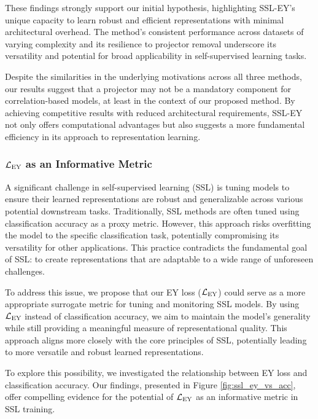 These findings strongly support our initial hypothesis, highlighting SSL-EY's unique capacity to learn robust and efficient representations with minimal architectural overhead. The method's consistent performance across datasets of varying complexity and its resilience to projector removal underscore its versatility and potential for broad applicability in self-supervised learning tasks.

Despite the similarities in the underlying motivations across all three methods, our results suggest that a projector may not be a mandatory component for correlation-based models, at least in the context of our proposed method. By achieving competitive results with reduced architectural requirements, SSL-EY not only offers computational advantages but also suggests a more fundamental efficiency in its approach to representation learning.

\subsubsection{$\mathcal{L}_\text{EY}$ as an Informative Metric}
A significant challenge in self-supervised learning (SSL) is tuning models to ensure their learned representations are robust and generalizable across various potential downstream tasks. Traditionally, SSL methods are often tuned using classification accuracy as a proxy metric. However, this approach risks overfitting the model to the specific classification task, potentially compromising its versatility for other applications. This practice contradicts the fundamental goal of SSL: to create representations that are adaptable to a wide range of unforeseen challenges.

To address this issue, we propose that our EY loss ($\mathcal{L}_\text{EY}$) could serve as a more appropriate surrogate metric for tuning and monitoring SSL models. By using $\mathcal{L}_\text{EY}$ instead of classification accuracy, we aim to maintain the model's generality while still providing a meaningful measure of representational quality. This approach aligns more closely with the core principles of SSL, potentially leading to more versatile and robust learned representations.

To explore this possibility, we investigated the relationship between EY loss and classification accuracy. Our findings, presented in Figure \ref{fig:ssl_ey_vs_acc}, offer compelling evidence for the potential of $\mathcal{L}_\text{EY}$ as an informative metric in SSL training.

